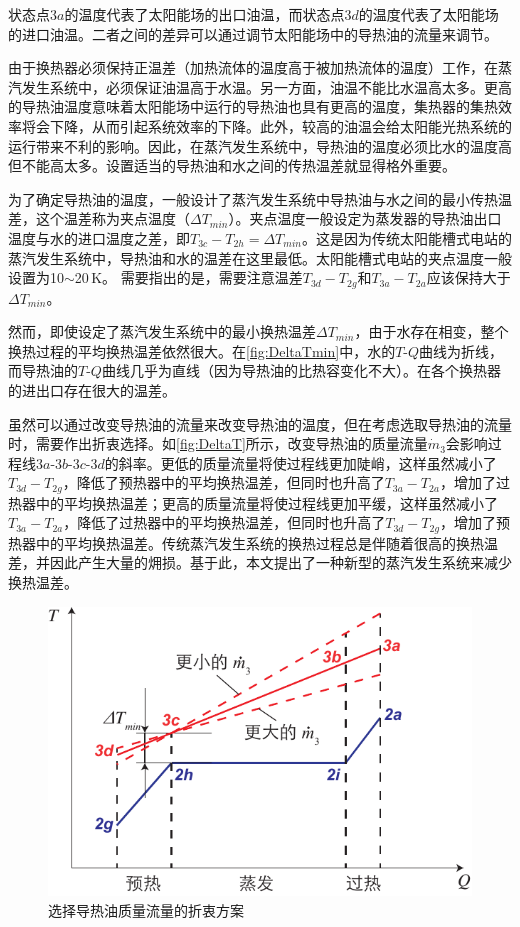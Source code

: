 状态点$3a$的温度代表了太阳能场的出口油温，而状态点$3d$的温度代表了太阳能场的进口油温。二者之间的差异可以通过调节太阳能场中的导热油的流量来调节。

由于换热器必须保持正温差（加热流体的温度高于被加热流体的温度）工作，在蒸汽发生系统中，必须保证油温高于水温。另一方面，油温不能比水温高太多。更高的导热油温度意味着太阳能场中运行的导热油也具有更高的温度，集热器的集热效率将会下降，从而引起系统效率的下降。此外，较高的油温会给太阳能光热系统的运行带来不利的影响。因此，在蒸汽发生系统中，导热油的温度必须比水的温度高但不能高太多。设置适当的导热油和水之间的传热温差就显得格外重要。

为了确定导热油的温度，一般设计了蒸汽发生系统中导热油与水之间的最小传热温差，这个温差称为夹点温度（$\Delta T_{min}$）。夹点温度一般设定为蒸发器的导热油出口温度与水的进口温度之差，即$T_{3c} - T_{2h} = \Delta T_{min}$。这是因为传统太阳能槽式电站的蒸汽发生系统中，导热油和水的温差在这里最低。太阳能槽式电站的夹点温度一般设置为10$\sim$20$\,\mathrm{K}$。
需要指出的是，需要注意温差$T_{3d} - T_{2g}$和$T_{3a} - T_{2a}$应该保持大于$\Delta T_{min}$。

然而，即使设定了蒸汽发生系统中的最小换热温差$\Delta T_{min}$，由于水存在相变，整个换热过程的平均换热温差依然很大。在\autoref{fig:DeltaTmin}中，水的$T$-$Q$曲线为折线，而导热油的$T$-$Q$曲线几乎为直线（因为导热油的比热容变化不大）。在各个换热器的进出口存在很大的温差。

虽然可以通过改变导热油的流量来改变导热油的温度，但在考虑选取导热油的流量时，需要作出折衷选择。如\autoref{fig:DeltaT}所示，改变导热油的质量流量$\dot{m}_3$会影响过程线$3a$-$3b$-$3c$-$3d$的斜率。更低的质量流量将使过程线更加陡峭，这样虽然减小了$T_{3d} - T_{2g}$，降低了预热器中的平均换热温差，但同时也升高了$T_{3a} - T_{2a}$，增加了过热器中的平均换热温差；更高的质量流量将使过程线更加平缓，这样虽然减小了$T_{3a} - T_{2a}$，降低了过热器中的平均换热温差，但同时也升高了$T_{3d} - T_{2g}$，增加了预热器中的平均换热温差。传统蒸汽发生系统的换热过程总是伴随着很高的换热温差，并因此产生大量的㶲损。基于此，本文提出了一种新型的蒸汽发生系统来减少换热温差。
\begin{figure}[htbp]
\centering
	\includegraphics[width = 0.5\columnwidth]{fig/DeltaT}
	\caption{选择导热油质量流量的折衷方案}
	\label{fig:DeltaT}
\end{figure}

